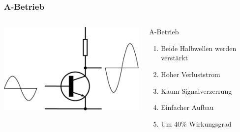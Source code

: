 \begin{frame}
    \frametitle{A-Betrieb}
        \begin{columns}[c]
        \begin{center}
            \includegraphics[width=1\textwidth,height=.8\textheight,keepaspectratio]{a07/Electronic_Amplifier_Class_A.png}\\
	    {\tiny \hyperlink{refs}{\cite{wm}}}
    \end{center}
     \large
    \begin{block}{A-Betrieb}
	    \begin{enumerate} 
			\item Beide Halbwellen werden verstärkt
			\item Hoher Verluststrom
			\item Kaum Signalverzerrung
			\item Einfacher Aufbau
			\item Um $40\%$ Wirkungsgrad
    	\end{enumerate}
    \end{block}
    \end{columns}
\end{frame}

